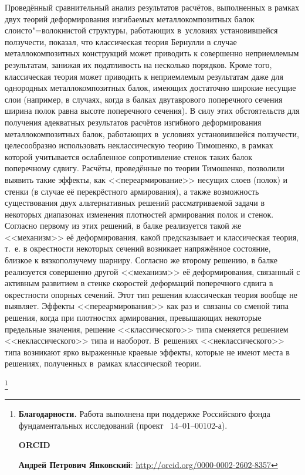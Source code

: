  Проведённый сравнительный анализ результатов расчётов, выполненных в рамках двух теорий деформирования изгибаемых металлокомпозитных балок слоисто"=волокнистой структуры, работающих в~условиях установившейся ползучести, показал, что классическая теория Бернулли в случае металлокомпозитных конструкций может приводить к совершенно неприемлемым результатам, занижая их податливость на несколько порядков. Кроме того, классическая теория может приводить к неприемлемым результатам даже для однородных металлокомпозитных балок, имеющих достаточно широкие несущие слои (например, в случаях, когда в балках двутаврового поперечного сечения ширина полок равна высоте поперечного сечения). В силу этих обстоятельств для получения адекватных результатов расчётов изгибного деформирования металлокомпозитных балок, работающих в~условиях установившейся ползучести, целесообразно использовать неклассическую теорию Тимошенко, в рамках которой учитывается ослабленное сопротивление стенок таких балок поперечному сдвигу. Расчёты, проведённые по теории Тимошенко, позволили выявить такие эффекты, как <<переармирование>> несущих слоев (полок) и стенки (в случае её перекрёстного армирования), а также возможность существования двух альтернативных решений рассматриваемой задачи в некоторых диапазонах изменения плотностей армирования полок и стенок. Согласно первому из этих решений, в балке реализуется такой же <<механизм>> её деформирования, какой предсказывает и классическая теория, т.~е. в окрестности некоторых сечений возникает напряжённое состояние, близкое к вязкоползучему шарниру. Согласно же второму решению, в балке реализуется совершенно другой <<механизм>> её деформирования, связанный с активным развитием в стенке скоростей деформаций поперечного сдвига в окрестности опорных сечений. Этот тип решения классическая теория вообще не выявляет. Эффекты <<переармирования>> как раз и~связаны со сменой типа решения, когда при плотностях армирования, превышающих некоторые предельные значения, решение <<классического>> типа сменяется решением <<неклассического>> типа и наоборот. 
В~решениях <<неклассического>> типа возникают ярко выраженные краевые эффекты, которые не имеют места в решениях, полученных в~рамках классической теории.







\thanks{\textbf{Благодарности.} Работа выполнена при поддержке Российского фонда фундаментальных исследований (проект \No~14--01--00102-а).


\bigskip

\textbf{ORCID}

\textbf{Андрей Петрович Янковский}: \url{http://orcid.org/0000-0002-2602-8357}


}



